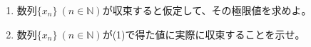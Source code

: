 \documentclass[a4paper]{ltjsarticle}
\begin{document}
\begin{question*}
\begin{enumerate}[label=\arabic*.]
  \begin{enumerate}[label=(\arabic*)]
    \item 数列$\{x_n\}\:(n\in \mathbb{N})$が収束すると仮定して、その極限値を求めよ。
    \item 数列$\{x_n\}\:(n\in \mathbb{N})$が(1)で得た値に実際に収束することを示せ。
  \end{enumerate}

\end{enumerate}
\end{question*}
\end{document}
